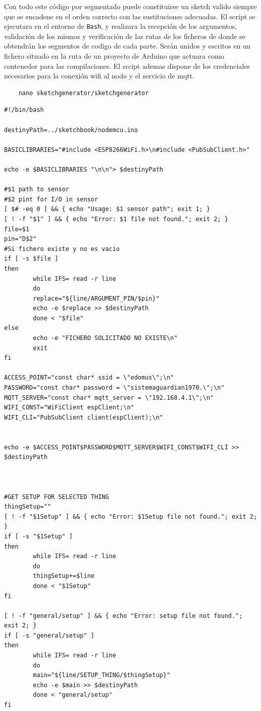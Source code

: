 Con todo este código por segmentado puede constituirse un \gls{sketch} valido siempre que se encadene en el orden correcto con las sustituciones adecuadas. El script se ejecutara en el entorno de \verb|Bash|, y realizara la recepción de los argumentos, validación de los mismos y verificación de las rutas de los ficheros de donde se obtendrán los segmentos de codigo de cada parte. Serán unidos y escritos en un fichero situado en la ruta de un proyecto de Arduino que actuara como contenedor para las compilaciones. El srcipt ademas dispone de los credenciales necesarios para la conexión \gls{wifi} al nodo y el servicio de \gls{mqtt}.

\begin{verbatim}
    nano sketchgenerator/sketchgenerator
\end{verbatim}

\begin{verbatim}
#!/bin/bash

destinyPath=../sketchbook/nodemcu.ino

BASICLIBRARIES="#include <ESP8266WiFi.h>\n#include <PubSubClient.h>"

echo -e $BASICLIBRARIES "\n\n"> $destinyPath

#$1 path to sensor
#$2 pint for I/O in sensor
[ $# -eq 0 ] && { echo "Usage: $1 sensor path"; exit 1; }
[ ! -f "$1" ] && { echo "Error: $1 file not found."; exit 2; }
file=$1
pin="D$2"
#Si fichero existe y no es vacio
if [ -s $file ]
then
        while IFS= read -r line
        do
        replace="${line/ARGUMENT_PIN/$pin}"
        echo -e $replace >> $destinyPath
        done < "$file"
else
        echo -e "FICHERO SOLICITADO NO EXISTE\n"
        exit
fi

ACCESS_POINT="const char* ssid = \"edomus\";\n"
PASSWORD="const char* password = \"sistemaguardian1970.\";\n"
MQTT_SERVER="const char* mqtt_server = \"192.168.4.1\";\n"
WIFI_CONST="WiFiClient espClient;\n"
WIFI_CLI="PubSubClient client(espClient);\n"


echo -e $ACCESS_POINT$PASSWORD$MQTT_SERVER$WIFI_CONST$WIFI_CLI >> $destinyPath



#GET SETUP FOR SELECTED THING
thingSetup=""
[ ! -f "$1Setup" ] && { echo "Error: $1Setup file not found."; exit 2; }
if [ -s "$1Setup" ]
then
        while IFS= read -r line
        do
        thingSetup+=$line
        done < "$1Setup"
fi

[ ! -f "general/setup" ] && { echo "Error: setup file not found."; exit 2; }
if [ -s "general/setup" ]
then
        while IFS= read -r line
        do
        main="${line/SETUP_THING/$thingSetup}"
        echo -e $main >> $destinyPath
        done < "general/setup"
fi
\end{verbatim}